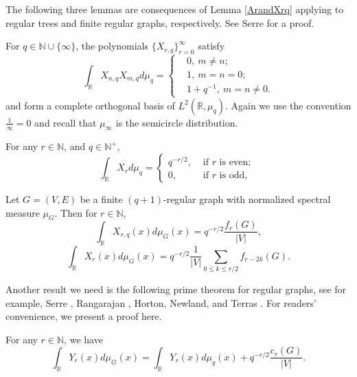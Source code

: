 \documentclass{article}
\begin{document}
The following three lemmas are consequences of Lemma \ref{ArandXrq} applying to regular trees and finite regular graphs, respectively. See Serre \cite{Ser97} for a proof.
\begin{lemma}\label{lemma:orthogonal}
    For $q\in \mathbb{N} \cup \{\infty\}$, 
    the polynomials $\{X_{r,q}\}_{r=0}^{\infty}$ 
satisfy 
\begin{equation}\label{orthogonalrelation}
\int_\mathbb{R} X_{n,q} X_{m,q}d\mu_{q}=\left\{
\begin{aligned}
    &0, \ m\neq n;\\
    &1, \ m=n=0;\\
    &1+q^{-1}, \ m=n\neq 0.
\end{aligned} \right.
\end{equation}
and form a complete orthogonal basis of $L^2(\mathbb{R},\mu_{q})$. Again we use the convention $\frac{1}{\infty}=0$ and recall that $\mu_{\infty}$ is the semicircle distribution.
\end{lemma}

\begin{lemma}\label{Xrandmuq}
For any $r \in \mathbb{N}$, and $q \in \mathbb{N}^{+}$,
$$
\int_{\mathbb{R}} X_r d \mu_q= \begin{cases}q^{-r / 2}, & \text { if } r \text { is even; } \\ 0, & \text { if } r \text { is odd, }\end{cases}
$$
\end{lemma}

\begin{lemma}\label{polytrace}
    Let $G=(V,E)$ be a finite $(q+1)\text{-}$regular graph with normalized spectral measure $\mu_G$. Then for $r \in \mathbb{N}$,
    \begin{equation}\label{1stchebgeo}
    \int_{\mathbb{R}} X_{r,q}(x)d\mu_G(x)=q^{-r/2}\frac{f_r(G)}{|V|},
\end{equation}
\begin{equation}\label{2ndchebgeo}
\int_{\mathbb{R}} X_{r}(x)d\mu_G(x)=q^{-r/2}\frac{1}{|V|}\sum_{0\leq k\leq r/2} f_{r-2k}(G).
\end{equation}
\end{lemma}

Another result we need is the following prime theorem for regular graphs, see for example, Serre \cite{Ser97}, Rangarajan \cite{RB18}, Horton, Newland, and Terras \cite{HNT06}. For readers' convenience, we present a proof here. 

\begin{theorem}\label{primethm}
For any $r \in \mathbb{N}$, we have
\begin{equation}\label{circuitnumber}
    \int_{\mathbb{R}} Y_{r}(x)d\mu_G(x)=\int_{\mathbb{R}} Y_{r}(x)d\mu_q(x)+q^{-r/2}\frac{c_r(G)}{|V|}.
\end{equation}
\end{theorem}
\end{document}

